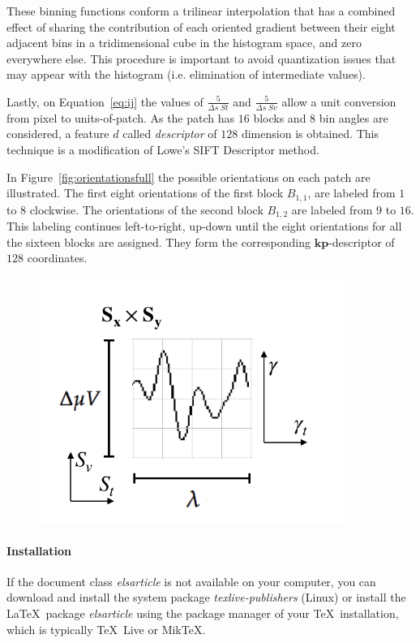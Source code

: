 \documentclass[review]{elsarticle}
\begin{document}
These binning functions conform a trilinear interpolation that has a combined effect of sharing the contribution of each oriented gradient between their eight adjacent bins in a tridimensional cube in the histogram space, and zero everywhere else.  This procedure is important to avoid quantization issues that may appear with the histogram (i.e. elimination of intermediate values).

Lastly, on Equation~\ref{eq:ij} the values of $ \frac{5}{\Delta s \; St} $ and $ \frac{5}{\Delta s \; Sv} $ allow a unit conversion from pixel to units-of-patch.  As the patch has  $16$ blocks and  $8$ bin angles are considered, a feature $d$ called \textit{descriptor} of $128$ dimension is obtained. This technique is a modification of Lowe's SIFT Descriptor method.

In Figure~\ref{fig:orientationsfull} the possible orientations on each patch are illustrated.  The first eight orientations of the first block $ B_{1,1} $, are labeled from $1$ to $8$ clockwise. The orientations of the second block $ B_{1,2} $ are labeled from $9$ to $16$.  This labeling continues left-to-right, up-down until the eight orientations for all the sixteen blocks are assigned. They form the corresponding $\mathbf{kp}$-descriptor of $128$ coordinates.


\begin{figure}[h!]
\centering
\includegraphics[width=10cm]{images/patchgeometry.pdf}
\caption[Patch Geometry]{  }
\label{fig:patchgeometry}
\end{figure}

\paragraph{Installation} If the document class \emph{elsarticle} is not available on your computer, you can download and install the system package \emph{texlive-publishers} (Linux) or install the \LaTeX\ package \emph{elsarticle} using the package manager of your \TeX\ installation, which is typically \TeX\ Live or Mik\TeX.
\end{document}
